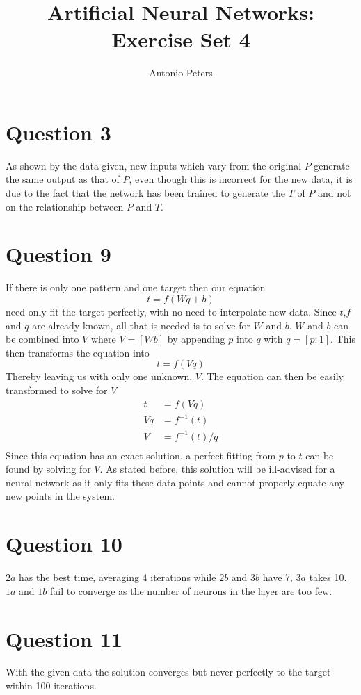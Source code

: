 \documentclass[a4paper,10pt]{article}
\title{Artificial Neural Networks:\\ Exercise Set 4}
\author{Antonio Peters}
\begin{document}
\maketitle

\section{Question 3}
As shown by the data given, new inputs which vary from the original $P$ generate the same output as that of $P$, even though this is incorrect for the new data, it is due to the fact that the network has been trained to generate the $T$ of $P$ and not on the relationship between $P$ and $T$.

\section{Question 9}
If there is only one pattern and one target then our equation
\begin{equation}
 t = f(Wq+b)
\end{equation}
need only fit the target perfectly, with no need to interpolate new data. Since $t$,$f$ and $q$ are already known, all that is needed is to solve for $W$ and $b$. $W$ and $b$ can be combined into $V$ where $V=[W b]$ by appending $p$ into $q$ with $q=[p;1]$. This then transforms the equation into 
\begin{equation}
 t = f(Vq)
\end{equation}
Thereby leaving us with only one unknown, $V$. The equation can then be easily transformed to solve for $V$
\begin{equation}
\begin{align}
 t &= f(Vq)\\
 Vq &= f^{-1}(t)\\
 V &= f^{-1}(t)/q\\
\end{align}
\end{equation}
Since this equation has an exact solution, a perfect fitting from $p$ to $t$ can be found by solving for $V$. As stated before, this solution will be ill-advised for a neural network as it only fits these data points and cannot properly equate any new points in the system.

\section{Question 10}
$2a$ has the best time, averaging 4 iterations while $2b$ and $3b$ have 7, $3a$ takes 10. $1a$ and $1b$ fail to converge as the number of neurons in the layer are too few.

\section{Question 11}
With the given data the solution converges but never perfectly to the target within 100 iterations.
\end{document}
